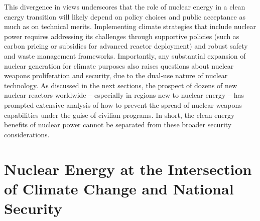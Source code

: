 \documentclass[11,5 pt]{article}
\begin{document}
This divergence in views underscores that the role of nuclear energy in a clean energy transition will likely depend on policy choices and public acceptance as much as on technical merits. Implementing climate strategies that include nuclear power requires addressing its challenges through supportive policies (such as carbon pricing or subsidies for advanced reactor deployment) and robust safety and waste management frameworks. Importantly, any substantial expansion of nuclear generation for climate purposes also raises questions about nuclear weapons proliferation and security, due to the dual-use nature of nuclear technology. As discussed in the next sections, the prospect of dozens of new nuclear reactors worldwide – especially in regions new to nuclear energy – has prompted extensive analysis of how to prevent the spread of nuclear weapons capabilities under the guise of civilian programs. In short, the clean energy benefits of nuclear power cannot be separated from these broader security considerations.


\section{Nuclear Energy at the Intersection of Climate Change and National Security}
\end{document}
